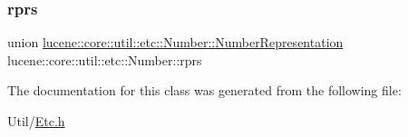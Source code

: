 \mbox{\label{classlucene_1_1core_1_1util_1_1etc_1_1Number_a9f9e1028ed9708026ff9a73d48b4d245}} 
\subsubsection{\texorpdfstring{rprs}{rprs}}
{\footnotesize\ttfamily union \mbox{\hyperlink{unionlucene_1_1core_1_1util_1_1etc_1_1Number_1_1NumberRepresentation}{lucene\+::core\+::util\+::etc\+::\+Number\+::\+Number\+Representation}}  lucene\+::core\+::util\+::etc\+::\+Number\+::rprs\hspace{0.3cm}{\ttfamily [private]}}



The documentation for this class was generated from the following file\+:\begin{DoxyCompactItemize}
\item 
Util/\mbox{\hyperlink{Etc_8h}{Etc.\+h}}\end{DoxyCompactItemize}
